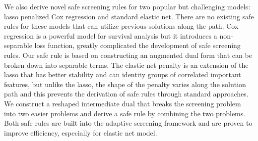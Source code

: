 {We also derive novel safe screening rules for two popular but challenging models: lasso penalized Cox regression and standard elastic net. There are no existing safe rules for these models that can utilize previous solutions along the path. Cox regression is a powerful model for survival analysis but it introduces a non-separable loss function, greatly complicated the development of safe screening rules. Our safe rule is based on constructing an augmented dual form that can be broken down into separable terms. The elastic net penalty is an extension of the lasso that has better stability and can identity groups of correlated important features, but unlike the lasso, the shape of the penalty varies along the solution path and this prevents the derivation of safe rules through standard approaches. We construct a reshaped intermediate dual that breaks the screening problem into two easier problems and derive a safe rule by combining the two problems. Both safe rules are built into the adaptive screening framework and are proven to improve efficiency, especially for elastic net model. 
}



 
\newcommand{\acknowledgement}
{
I would like to express my thanks to my advisor Professor Patrick Breheny. He provides me with interesting directions for my research and my works cannot be done without his guidance. He also patiently relieves my confusion and gives me supportive advice for improvement. I would also like to thank my other committee members, Professors Kung-Sik Chan, Jian Huang, Luke Tierney, and Tianbao Yang, for their helpful suggestions and comments. Besides, I want to thank all the great friends I met in University of Iowa for adding fun to my life outside of research. Last, I want to thank my mom, my dad and my wife. Their encouragement and love support me through this arduous journey.
}

